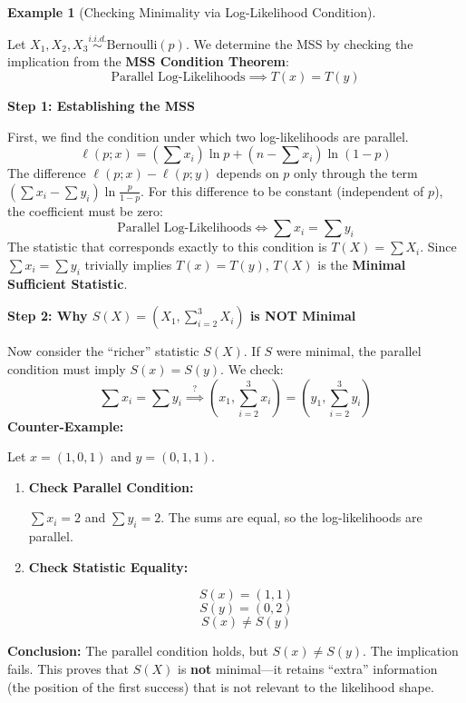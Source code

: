 \documentclass[
  letterpaper,
  DIV=11,
  numbers=noendperiod]{scrreprt}
\renewcommand{\[}{\begin{equation}}
\renewcommand{\]}{\end{equation}}
\theoremstyle{definition}
\theoremstyle{plain}
\theoremstyle{plain}
\theoremstyle{plain}
\theoremstyle{definition}
\newtheorem{example}{Example}[chapter]
\theoremstyle{plain}
\theoremstyle{remark}
\begin{document}
\begin{example}[Checking Minimality via Log-Likelihood
Condition]\protect\hypertarget{exm-bernoulli-mss-check}{}\label{exm-bernoulli-mss-check}

Let \(X_1, X_2, X_3 \overset{i.i.d.}{\sim} \text{Bernoulli}(p)\). We
determine the MSS by checking the implication from the \textbf{MSS
Condition Theorem}: \[
\text{Parallel Log-Likelihoods} \implies T(x) = T(y)
\]

\textbf{Step 1: Establishing the MSS}

First, we find the condition under which two log-likelihoods are
parallel. \[
\ell(p; x) = (\sum x_i) \ln p + (n - \sum x_i) \ln(1-p)
\] The difference \(\ell(p; x) - \ell(p; y)\) depends on \(p\) only
through the term \((\sum x_i - \sum y_i) \ln \frac{p}{1-p}\). For this
difference to be constant (independent of \(p\)), the coefficient must
be zero: \[
\text{Parallel Log-Likelihoods} \iff \sum x_i = \sum y_i
\] The statistic that corresponds exactly to this condition is
\(T(X) = \sum X_i\). Since \(\sum x_i = \sum y_i\) trivially implies
\(T(x) = T(y)\), \(T(X)\) is the \textbf{Minimal Sufficient Statistic}.

\textbf{Step 2: Why \(S(X) = (X_1, \sum_{i=2}^3 X_i)\) is NOT Minimal}

Now consider the ``richer'' statistic \(S(X)\). If \(S\) were minimal,
the parallel condition must imply \(S(x) = S(y)\). We check: \[
\sum x_i = \sum y_i \stackrel{?}{\implies} (x_1, \sum_{i=2}^3 x_i) = (y_1, \sum_{i=2}^3 y_i)
\] \textbf{Counter-Example:}

Let \(x = (1, 0, 1)\) and \(y = (0, 1, 1)\).

\begin{enumerate}
\def\labelenumi{\arabic{enumi}.}
\item
  \textbf{Check Parallel Condition:}

  \(\sum x_i = 2\) and \(\sum y_i = 2\). The sums are equal, so the
  log-likelihoods are parallel.
\item
  \textbf{Check Statistic Equality:}

  \[S(x) = (1, 1)\] \[S(y) = (0, 2)\] \[S(x) \neq S(y)\]
\end{enumerate}

\textbf{Conclusion:} The parallel condition holds, but
\(S(x) \neq S(y)\). The implication fails. This proves that \(S(X)\) is
\textbf{not} minimal---it retains ``extra'' information (the position of
the first success) that is not relevant to the likelihood shape.

\end{example}
\end{document}

